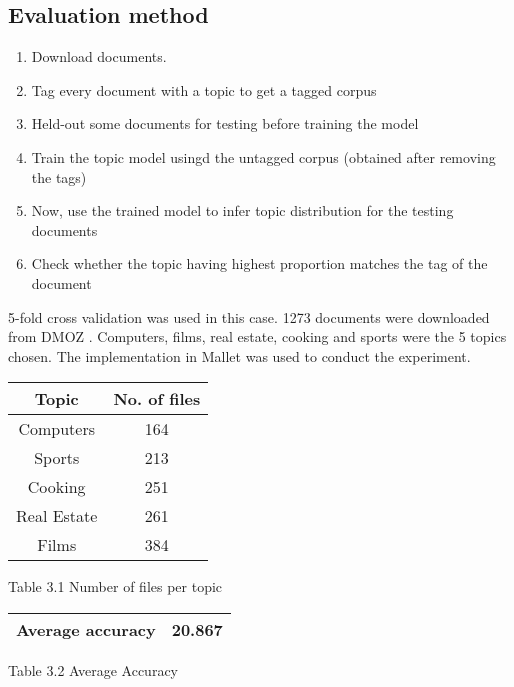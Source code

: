 \subsection*{Evaluation method}

\begin{enumerate}
 \item Download documents.
 \item Tag every document with a topic to get a tagged corpus
 \item Held-out some documents for testing before training the model
 \item Train the topic model usingd the untagged corpus (obtained after removing the tags)
 \item Now, use the trained model to infer topic distribution for the testing documents
 \item Check whether the topic having highest proportion matches the tag of the document
\end{enumerate}

5-fold cross validation was used in this case. 1273 documents were downloaded from DMOZ \citep*{dmoz}. Computers, films, real estate, cooking and
sports were the 5 topics chosen. The implementation in Mallet was used to conduct the experiment.

\begin{center}
\begin{tabular}{ |c|c| }
  \hline
  Topic & No. of files \\ \hline
  Computers & 164 \\ \hline
  Sports & 213 \\ \hline
  Cooking & 251 \\ \hline
  Real Estate & 261 \\ \hline
  Films & 384 \\ \hline
\end{tabular}
\end{center}
\begin{center}
 Table 3.1 Number of files per topic
\end{center}

\begin{center}
\begin{tabular}{ |c|c| }
  \hline
  Average accuracy & 20.867 \\ \hline
\end{tabular}
\end{center}
\begin{center}
 Table 3.2 Average Accuracy 
\end{center}

